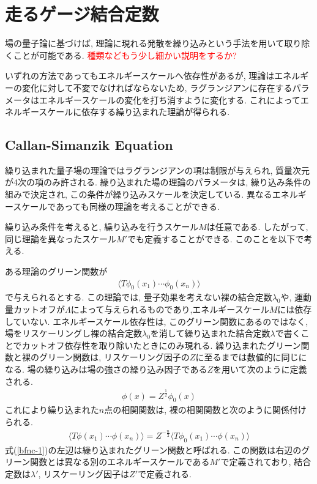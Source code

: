 \section{走るゲージ結合定数}
場の量子論に基づけば, 理論に現れる発散を繰り込みという手法を用いて取り除くことが可能である.
\textcolor{red}{種類などもう少し細かい説明をするか?}

いずれの方法であってもエネルギースケールへ依存性があるが, 理論はエネルギーの変化に対して不変でなければならないため, ラグランジアンに存在するパラメータはエネルギースケールの変化を打ち消すように変化する.
これによってエネルギースケールに依存する繰り込まれた理論が得られる.
\subsection{Callan-Simanzik Equation}
繰り込まれた量子場の理論ではラグランジアンの項は制限が与えられ, 質量次元が4次の項のみ許される.
繰り込まれた場の理論のパラメータは, 繰り込み条件の組みで決定され, この条件が繰り込みスケールを決定している.
異なるエネルギースケールであっても同様の理論を考えることができる.

繰り込み条件を考えると, 繰り込みを行うスケール$M$は任意である.
したがって, 同じ理論を異なったスケール$M'$でも定義することができる.
このことを以下で考える. 

ある理論のグリーン関数が
\begin{align}
  \langle T \phi_0(x_1)\cdots\phi_0(x_n)\rangle 
\end{align}
で与えられるとする.
この理論では, 量子効果を考えない裸の結合定数$\lambda_0$や, 運動量カットオフが$\Lambda$によって与えられるものであり,エネルギースケール$M$には依存していない.
エネルギースケール依存性は, このグリーン関数にあるのではなく, 場をリスケーリングし裸の結合定数$\lambda_0$を消して繰り込まれた結合定数$\lambda$で書くことでカットオフ依存性を取り除いたときにのみ現れる.
繰り込まれたグリーン関数と裸のグリーン関数は, リスケーリング因子の$Z$に至るまでは数値的に同じになる.
場の繰り込みは場の強さの繰り込み因子である$Z$を用いて次のように定義される.
\begin{align}
  \phi(x) = Z^{\frac{1}{2}}\phi_0(x) \label{bfnc-2}
\end{align}
これにより繰り込まれた$n$点の相関関数は, 裸の相関関数と次のように関係付けられる.
\begin{align}
  \langle T \phi(x_1)\cdots \phi(x_n)\rangle = Z^{-\frac{n}{2}}\langle T \phi_0(x_1)\cdots \phi(x_n)\rangle \label{bfnc-1}
\end{align}
式(\ref{bfnc-1})の左辺は繰り込まれたグリーン関数と呼ばれる.
この関数は右辺のグリーン関数とは異なる別のエネルギースケールである$M'$で定義されており, 結合定数は$\lambda'$, リスケーリング因子は$Z'$で定義される.

